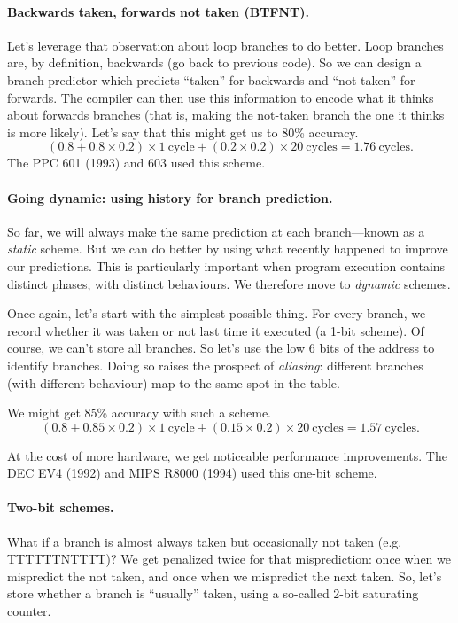 \documentclass[a4paper]{report}
\begin{document}
\paragraph{Backwards taken, forwards not taken (BTFNT).}
Let's leverage that observation about loop branches to do better.
Loop branches are, by definition, backwards (go back to previous
code). So we can design a branch predictor which predicts ``taken''
for backwards and ``not taken'' for forwards. The compiler can then
use this information to encode what it thinks about forwards branches
(that is, making the not-taken branch the one it thinks is more likely).
Let's say that this might get us to 80\% accuracy. \[
(0.8 + 0.8 \times 0.2) \times 1 \mathrm{~cycle} + (0.2 \times 0.2) \times 20 \mathrm{~cycles} = 1.76 \mathrm{~cycles}.
\]
The PPC 601 (1993) and 603 used this scheme.

\paragraph{Going dynamic: using history for branch prediction.}
So far, we will always make the same prediction at each branch---known as a
\emph{static} scheme. But we can do better by using what recently happened to
improve our predictions. This is particularly important when program execution
contains distinct phases, with distinct behaviours.
We therefore move to \emph{dynamic} schemes.

Once again, let's start with the simplest possible thing. For every branch,
we record whether it was taken or not last time it executed (a 1-bit scheme).
Of course, we can't store all branches. So let's use the low 6 bits of the address
to identify branches. Doing so raises the prospect of \emph{aliasing}:
different branches (with different behaviour) map to the same spot in the table.

We might get 85\% accuracy with such a scheme.
\[
(0.8 + 0.85 \times 0.2) \times 1 \mathrm{~cycle} + (0.15 \times 0.2) \times 20 \mathrm{~cycles} = 1.57 \mathrm{~cycles}.
\]

At the cost of more hardware, we get noticeable performance improvements. The DEC EV4 (1992) and
MIPS R8000 (1994) used this one-bit scheme.

\paragraph{Two-bit schemes.}
What if a branch is almost always taken but occasionally not taken (e.g. TTTTTTNTTTT)?
We get penalized twice
for that misprediction: once when we mispredict the not taken, and once when we mispredict the
next taken. So, let's store whether a branch is ``usually'' taken, using a so-called
2-bit saturating counter.
\end{document}
